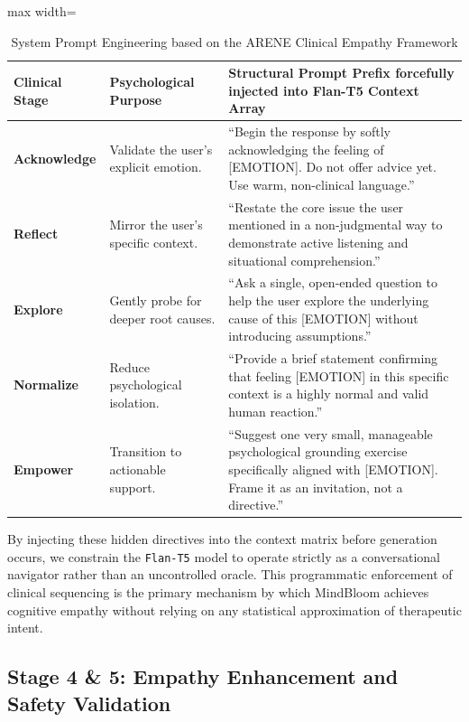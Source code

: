 \documentclass[12pt,twoside]{article}
\begin{document}
\begin{table}[htbp]
\centering
\Large
\renewcommand{\arraystretch}{2.4}
\begin{adjustbox}{max width=\textwidth}
\begin{tabular}{|p{3.0cm}|p{4.8cm}|p{10.8cm}|}
\hline
\rowcolor{gray!20}
\textbf{Clinical Stage} & \textbf{Psychological Purpose} & \textbf{Structural Prompt Prefix forcefully injected into Flan-T5 Context Array} \\
\hline
\textbf{Acknowledge} & Validate the user's explicit emotion. & ``Begin the response by softly acknowledging the feeling of [EMOTION]. Do not offer advice yet. Use warm, non-clinical language.'' \\
\hline
\textbf{Reflect} & Mirror the user's specific context. & ``Restate the core issue the user mentioned in a non-judgmental way to demonstrate active listening and situational comprehension.'' \\
\hline
\textbf{Explore} & Gently probe for deeper root causes. & ``Ask a single, open-ended question to help the user explore the underlying cause of this [EMOTION] without introducing assumptions.'' \\
\hline
\textbf{Normalize} & Reduce psychological isolation. & ``Provide a brief statement confirming that feeling [EMOTION] in this specific context is a highly normal and valid human reaction.'' \\
\hline
\textbf{Empower} & Transition to actionable support. & ``Suggest one very small, manageable psychological grounding exercise specifically aligned with [EMOTION]. Frame it as an invitation, not a directive.'' \\
\hline
\end{tabular}
\end{adjustbox}
\caption{System Prompt Engineering based on the ARENE Clinical Empathy Framework}
\label{tab:arene}
\end{table}

By injecting these hidden directives into the context matrix before generation occurs, we constrain the \texttt{Flan-T5} model to operate strictly as a conversational navigator rather than an uncontrolled oracle. This programmatic enforcement of clinical sequencing is the primary mechanism by which MindBloom achieves cognitive empathy without relying on any statistical approximation of therapeutic intent.

\subsection{Stage 4 \& 5: Empathy Enhancement and Safety Validation}
\end{document}
